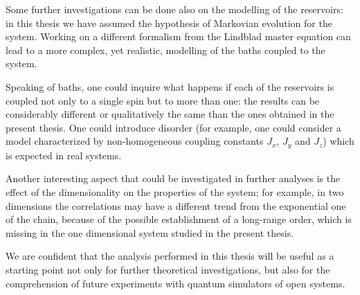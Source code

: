 Some further investigations can be done also on the modelling of the reservoirs:  in this thesis we have assumed the hypothesis of Markovian evolution for the system. Working on a different formalism from the Lindblad master equation can lead to a more complex, yet realistic, modelling of the baths coupled to the system. 

Speaking of baths, one could inquire what happens if each of the reservoirs is coupled not only to a single spin but to more than one: the results can be considerably different or qualitatively the same than the ones obtained in the present thesis. One could introduce disorder (for example, one could consider a model characterized by non-homogeneous coupling constants $J_x$, $J_y$ and $J_z$) which is expected in real systems.

Another interesting aspect that could be investigated in further analyses is the effect of the dimensionality on the properties of the system; for example, in two dimensions the correlations may have a different trend from the exponential one of the chain, because of the possible establishment of a long-range order, which is missing in the one dimensional system studied in the present thesis. 

We are confident that the analysis performed in this thesis will be useful as a starting point not only for further theoretical investigations, but also for the comprehension of future experiments with quantum simulators of open systems.



